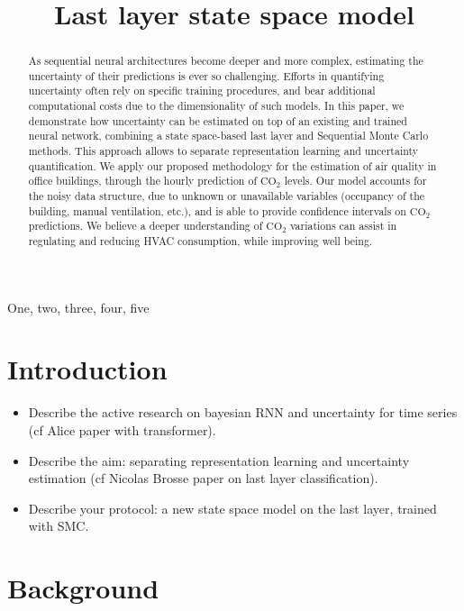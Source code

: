\documentclass{article}
\title{Last layer state space model}
\begin{document}
\maketitle

\begin{abstract}
	As sequential neural architectures become deeper and more complex, estimating the uncertainty of their predictions is ever so challenging.
	Efforts in quantifying uncertainty often rely on specific training procedures, and bear additional computational costs due to the dimensionality of such models.
	In this paper, we demonstrate how uncertainty can be estimated on top of an existing and trained neural network, combining a state space-based last  layer and  Sequential Monte Carlo methods. This approach allows to separate representation learning and uncertainty quantification. We apply our proposed methodology for the estimation of air quality in office buildings, through the hourly prediction of \ensuremath{\mathrm{CO_2}} levels.
	Our model accounts for the noisy data structure, due to unknown or unavailable variables (occupancy of the building, manual ventilation, etc.), and is able to provide confidence intervals on \ensuremath{\mathrm{CO_2}} predictions.
	We believe a deeper understanding of \ensuremath{\mathrm{CO_2}} variations can assist in regulating and reducing HVAC consumption, while improving well being.
\end{abstract}

\begin{keywords}
	One, two, three, four, five
\end{keywords}

\section{Introduction}
\label{sec:intro}
\begin{itemize}
	\item Describe the active research on bayesian RNN and uncertainty for time series (cf Alice paper with transformer).
	\item Describe the aim: separating  representation learning and uncertainty estimation (cf Nicolas Brosse paper on last layer classification).
	\item Describe your protocol: a new state space model on the last layer, trained with SMC.
\end{itemize}

\section{Background}
\label{sec:background}
\end{document}
